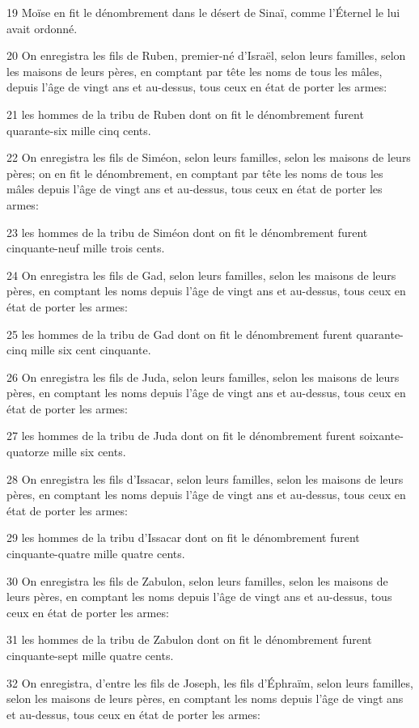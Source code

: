 \par 19 Moïse en fit le dénombrement dans le désert de Sinaï, comme l'Éternel le lui avait ordonné.
\par 20 On enregistra les fils de Ruben, premier-né d'Israël, selon leurs familles, selon les maisons de leurs pères, en comptant par tête les noms de tous les mâles, depuis l'âge de vingt ans et au-dessus, tous ceux en état de porter les armes:
\par 21 les hommes de la tribu de Ruben dont on fit le dénombrement furent quarante-six mille cinq cents.
\par 22 On enregistra les fils de Siméon, selon leurs familles, selon les maisons de leurs pères; on en fit le dénombrement, en comptant par tête les noms de tous les mâles depuis l'âge de vingt ans et au-dessus, tous ceux en état de porter les armes:
\par 23 les hommes de la tribu de Siméon dont on fit le dénombrement furent cinquante-neuf mille trois cents.
\par 24 On enregistra les fils de Gad, selon leurs familles, selon les maisons de leurs pères, en comptant les noms depuis l'âge de vingt ans et au-dessus, tous ceux en état de porter les armes:
\par 25 les hommes de la tribu de Gad dont on fit le dénombrement furent quarante-cinq mille six cent cinquante.
\par 26 On enregistra les fils de Juda, selon leurs familles, selon les maisons de leurs pères, en comptant les noms depuis l'âge de vingt ans et au-dessus, tous ceux en état de porter les armes:
\par 27 les hommes de la tribu de Juda dont on fit le dénombrement furent soixante-quatorze mille six cents.
\par 28 On enregistra les fils d'Issacar, selon leurs familles, selon les maisons de leurs pères, en comptant les noms depuis l'âge de vingt ans et au-dessus, tous ceux en état de porter les armes:
\par 29 les hommes de la tribu d'Issacar dont on fit le dénombrement furent cinquante-quatre mille quatre cents.
\par 30 On enregistra les fils de Zabulon, selon leurs familles, selon les maisons de leurs pères, en comptant les noms depuis l'âge de vingt ans et au-dessus, tous ceux en état de porter les armes:
\par 31 les hommes de la tribu de Zabulon dont on fit le dénombrement furent cinquante-sept mille quatre cents.
\par 32 On enregistra, d'entre les fils de Joseph, les fils d'Éphraïm, selon leurs familles, selon les maisons de leurs pères, en comptant les noms depuis l'âge de vingt ans et au-dessus, tous ceux en état de porter les armes:
